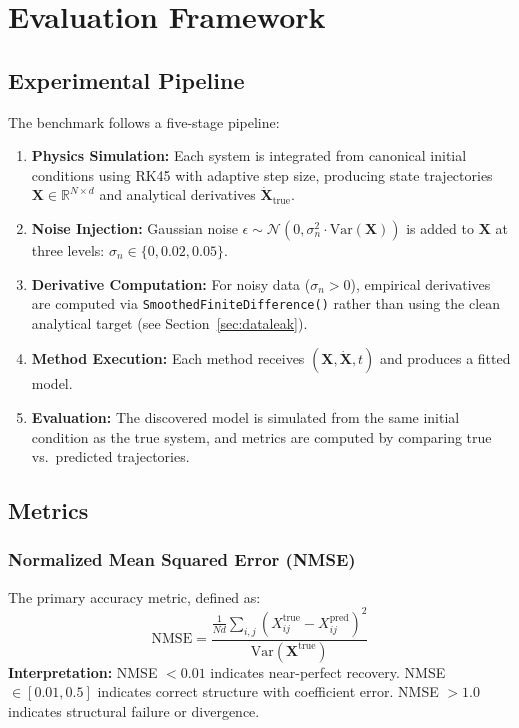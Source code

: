 \section{Evaluation Framework}
\label{sec:framework}

\subsection{Experimental Pipeline}
The benchmark follows a five-stage pipeline:
\begin{enumerate}
    \item \textbf{Physics Simulation:} Each system is integrated from canonical initial conditions using RK45 with adaptive step size, producing state trajectories $\mathbf{X} \in \mathbb{R}^{N \times d}$ and analytical derivatives $\dot{\mathbf{X}}_\text{true}$.
    \item \textbf{Noise Injection:} Gaussian noise $\epsilon \sim \mathcal{N}(0, \sigma_n^2 \cdot \text{Var}(\mathbf{X}))$ is added to $\mathbf{X}$ at three levels: $\sigma_n \in \{0, 0.02, 0.05\}$.
    \item \textbf{Derivative Computation:} For noisy data ($\sigma_n > 0$), empirical derivatives are computed via \texttt{SmoothedFiniteDifference()} rather than using the clean analytical target (see Section~\ref{sec:dataleak}).
    \item \textbf{Method Execution:} Each method receives $(\mathbf{X}, \dot{\mathbf{X}}, t)$ and produces a fitted model.
    \item \textbf{Evaluation:} The discovered model is simulated from the same initial condition as the true system, and metrics are computed by comparing true vs.\ predicted trajectories.
\end{enumerate}

\subsection{Metrics}

\subsubsection{Normalized Mean Squared Error (NMSE)}
The primary accuracy metric, defined as:
\begin{equation}
\text{NMSE} = \frac{\frac{1}{Nd}\sum_{i,j}(X_{ij}^\text{true} - X_{ij}^\text{pred})^2}{\text{Var}(\mathbf{X}^\text{true})}
\end{equation}
\textbf{Interpretation:} NMSE $< 0.01$ indicates near-perfect recovery. NMSE $\in [0.01, 0.5]$ indicates correct structure with coefficient error. NMSE $> 1.0$ indicates structural failure or divergence.

